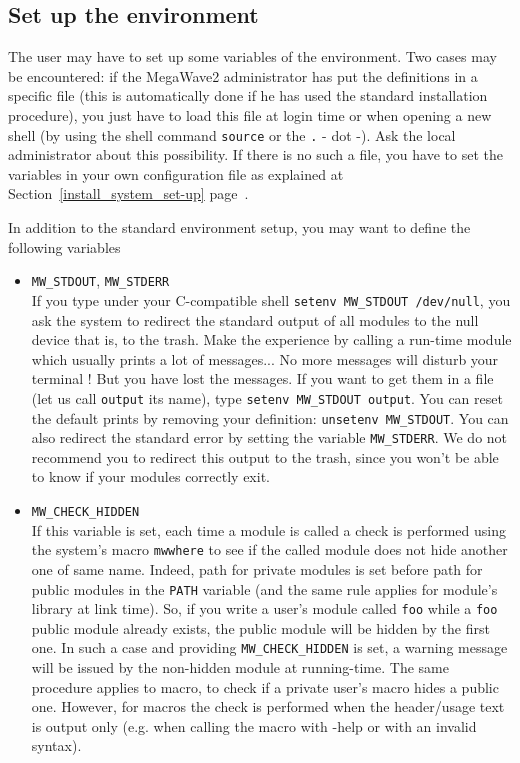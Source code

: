 \subsection{Set up the environment}
\label{install_user_set-up}

The user may have to set up some variables of the environment.
Two cases may be encountered: if the MegaWave2 administrator has put the definitions in a specific file
(this is automatically done if he has used the standard installation procedure), you just have to load this file at 
login time or when opening a new shell (by using the shell command \verb+source+ or the \verb+.+ - dot -).
Ask the local administrator about this possibility.
If there is no such a file, you have to set the variables in your own configuration file as explained at Section~\ref{install_system_set-up} page~\pageref{install_system_set-up}.

In addition to the standard environment setup, you may want to define the
following variables 
\begin{itemize}
\item \verb+MW_STDOUT+, \verb+MW_STDERR+ \\
If you type under your C-compatible shell \verb+setenv MW_STDOUT /dev/null+,
you ask the system to redirect the standard output of all modules to 
the null device that is, to the trash.
Make the experience by calling a run-time module which usually prints a 
lot of messages... No more messages will disturb your terminal !
But you have lost the messages. If you want to get them in a file 
(let us call \verb+output+ its name), type \verb+setenv MW_STDOUT output+.
You can reset the default prints by removing your definition: \verb+unsetenv MW_STDOUT+.
You can also redirect the standard error by setting the variable 
\verb+MW_STDERR+. We do not recommend you to redirect this output to the
trash, since you won't be able to know if your modules correctly exit.
\item \verb+MW_CHECK_HIDDEN+ \\
If this variable is set, 
each time a module is called a check is performed using the system's macro \verb+mwwhere+ to see if the 
called module does not hide another one of same name. Indeed, path for private modules is set
before path for public modules in the \verb+PATH+ variable (and the same rule applies for module's library at
link time). So, if you write a user's module called \verb+foo+ while a \verb+foo+ public module already exists, 
the public module will be hidden by the first one. In such a case and providing \verb+MW_CHECK_HIDDEN+ is
set, a warning message will be issued by the non-hidden module at running-time.
The same procedure applies to macro, to check if a private user's macro hides a public one.
However, for macros the check is performed when the header/usage text is output only (e.g. when calling
the macro with -help or with an invalid syntax).
\end{itemize}


